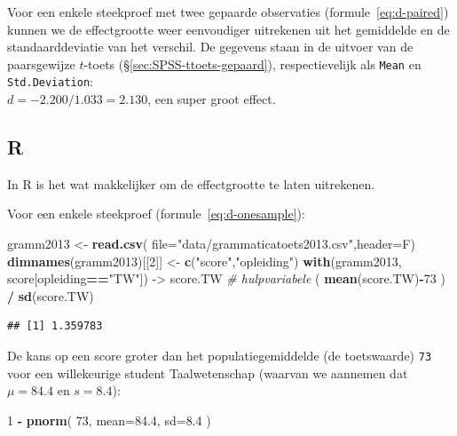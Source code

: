\documentclass[
]{book}
\newenvironment{Shaded}{\begin{snugshade}}{\end{snugshade}}
\newcommand{\CommentTok}[1]{\textcolor[rgb]{0.56,0.35,0.01}{\textit{#1}}}
\newcommand{\DataTypeTok}[1]{\textcolor[rgb]{0.13,0.29,0.53}{#1}}
\newcommand{\DecValTok}[1]{\textcolor[rgb]{0.00,0.00,0.81}{#1}}
\newcommand{\FloatTok}[1]{\textcolor[rgb]{0.00,0.00,0.81}{#1}}
\newcommand{\KeywordTok}[1]{\textcolor[rgb]{0.13,0.29,0.53}{\textbf{#1}}}
\newcommand{\NormalTok}[1]{#1}
\newcommand{\OperatorTok}[1]{\textcolor[rgb]{0.81,0.36,0.00}{\textbf{#1}}}
\newcommand{\StringTok}[1]{\textcolor[rgb]{0.31,0.60,0.02}{#1}}
\begin{document}
Voor een enkele steekproef met twee gepaarde observaties
(formule~\eqref{eq:d-paired}) kunnen we de effectgrootte weer eenvoudiger
uitrekenen uit het gemiddelde en de standaarddeviatie van het verschil.
De gegevens staan in de uitvoer van de paarsgewijze \(t\)-toets
(§\ref{sec:SPSS-ttoets-gepaard}), respectievelijk als \texttt{Mean} en
\texttt{Std.Deviation}:\\
\(d = -2.200 / 1.033 = 2.130\), een super groot effect.

\hypertarget{r-13}{%
\subsection{R}\label{r-13}}

In R is het wat makkelijker om de effectgrootte te laten uitrekenen.

Voor een enkele steekproef
(formule~\eqref{eq:d-onesample}):\\

\begin{Shaded}
\begin{Highlighting}[]
\NormalTok{gramm2013 \textless{}{-}}\StringTok{ }\KeywordTok{read.csv}\NormalTok{( }\DataTypeTok{file=}\StringTok{"data/grammaticatoets2013.csv"}\NormalTok{,}\DataTypeTok{header=}\NormalTok{F)}
\KeywordTok{dimnames}\NormalTok{(gramm2013)[[}\DecValTok{2}\NormalTok{]] \textless{}{-}}\StringTok{ }\KeywordTok{c}\NormalTok{(}\StringTok{"score"}\NormalTok{,}\StringTok{"opleiding"}\NormalTok{)}
\KeywordTok{with}\NormalTok{(gramm2013, score[opleiding}\OperatorTok{==}\StringTok{"TW"}\NormalTok{]) {-}\textgreater{}}\StringTok{ }\NormalTok{score.TW }\CommentTok{\# hulpvariabele}
\NormalTok{( }\KeywordTok{mean}\NormalTok{(score.TW)}\OperatorTok{{-}}\DecValTok{73}\NormalTok{ ) }\OperatorTok{/}\StringTok{ }\KeywordTok{sd}\NormalTok{(score.TW) }
\end{Highlighting}
\end{Shaded}

\begin{verbatim}
## [1] 1.359783
\end{verbatim}

De kans op een score groter dan het populatiegemiddelde (de toetswaarde) \texttt{73} voor een willekeurige student Taalwetenschap (waarvan we aannemen dat \(\mu=84.4\) en \(s=8.4\)):

\begin{Shaded}
\begin{Highlighting}[]
\DecValTok{1} \OperatorTok{{-}}\StringTok{ }\KeywordTok{pnorm}\NormalTok{( }\DecValTok{73}\NormalTok{, }\DataTypeTok{mean=}\FloatTok{84.4}\NormalTok{, }\DataTypeTok{sd=}\FloatTok{8.4}\NormalTok{ ) }
\end{Highlighting}
\end{Shaded}
\end{document}
